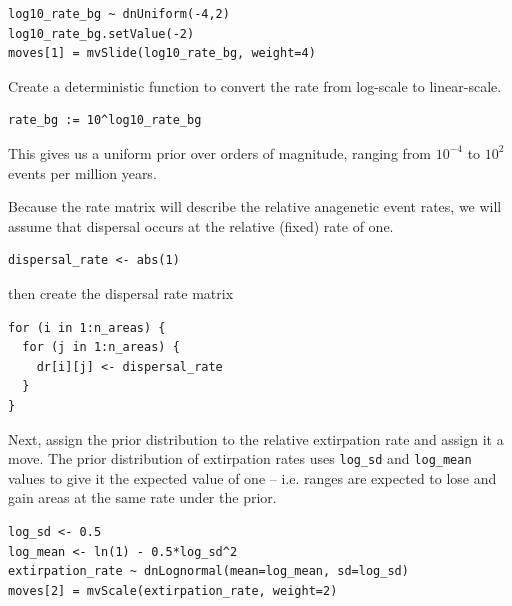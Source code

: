 \begin{snugshade}
\begin{lstlisting}
log10_rate_bg ~ dnUniform(-4,2)
log10_rate_bg.setValue(-2)
moves[1] = mvSlide(log10_rate_bg, weight=4)
\end{lstlisting}
\end{snugshade}

Create a deterministic function to convert the rate from log-scale to linear-scale.

\begin{snugshade}
\begin{lstlisting}
rate_bg := 10^log10_rate_bg
\end{lstlisting}
\end{snugshade}

This gives us a uniform prior over orders of magnitude, ranging from $10^{-4}$ to $10^2$ events per million years.

Because the rate matrix will describe the relative anagenetic event rates, we will assume that dispersal occurs at the relative (fixed) rate of one.

\begin{snugshade}
\begin{lstlisting}
dispersal_rate <- abs(1)
\end{lstlisting}
\end{snugshade}

then create the dispersal rate matrix

\begin{snugshade}
\begin{lstlisting}
for (i in 1:n_areas) {
  for (j in 1:n_areas) {
    dr[i][j] <- dispersal_rate
  }
}
\end{lstlisting}
\end{snugshade}

Next, assign the prior distribution to the relative extirpation rate and assign it a move.
The prior distribution of extirpation rates uses {\tt log\_sd} and {\tt log\_mean} values to give it the expected value of one -- i.e. ranges are expected to lose and gain areas at the same rate under the prior.

\begin{snugshade}
\begin{lstlisting}
log_sd <- 0.5
log_mean <- ln(1) - 0.5*log_sd^2
extirpation_rate ~ dnLognormal(mean=log_mean, sd=log_sd)
moves[2] = mvScale(extirpation_rate, weight=2)
\end{lstlisting}
\end{snugshade}

